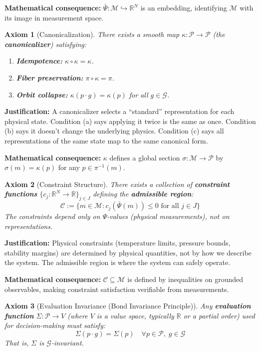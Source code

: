 \documentclass[11pt]{article}
\newtheorem{axiom}{Axiom}
\begin{document}
\textbf{Mathematical consequence:} $\bar{\Psi} : \mathcal{M} \hookrightarrow \mathbb{R}^N$ is an embedding, identifying $\mathcal{M}$ with its
image in measurement space.

\begin{axiom}[Canonicalization]
There exists a smooth map $\kappa : \mathcal{P} \to \mathcal{P}$ (the \textbf{canonicalizer})
satisfying:
\begin{enumerate}
    \item[(a)] \textbf{Idempotence:} $\kappa \circ \kappa = \kappa$.
    \item[(b)] \textbf{Fiber preservation:} $\pi \circ \kappa = \pi$.
    \item[(c)] \textbf{Orbit collapse:} $\kappa(p \cdot g) = \kappa(p)$ for all $g \in \mathcal{G}$.
\end{enumerate}
\end{axiom}

\textbf{Justification:} A canonicalizer selects a ``standard'' representation for each physical state.
Condition (a) says applying it twice is the same as once. Condition (b) says it doesn't change
the underlying physics. Condition (c) says all representations of the same state map to the
same canonical form.

\textbf{Mathematical consequence:} $\kappa$ defines a global section $\sigma : \mathcal{M} \to \mathcal{P}$ by $\sigma(m) = \kappa(p)$ for
any $p \in \pi^{-1}(m)$.

\begin{axiom}[Constraint Structure]
There exists a collection of \textbf{constraint functions} $\{c_j :
\mathbb{R}^N \to \mathbb{R}\}_{j \in J}$ defining the \textbf{admissible region}:
\[
\mathcal{C} := \{m \in \mathcal{M} : c_j(\bar{\Psi}(m)) \leq 0 \text{ for all } j \in J\}
\]
The constraints depend only on $\Psi$-values (physical measurements), not on representations.
\end{axiom}

\textbf{Justification:} Physical constraints (temperature limits, pressure bounds, stability margins)
are determined by physical quantities, not by how we describe the system. The admissible region
is where the system can safely operate.

\textbf{Mathematical consequence:} $\mathcal{C} \subseteq \mathcal{M}$ is defined by inequalities on grounded observables,
making constraint satisfaction verifiable from measurements.

\begin{axiom}[Evaluation Invariance (Bond Invariance Principle)]
Any \textbf{evaluation function}
$\Sigma : \mathcal{P} \to V$ (where $V$ is a value space, typically $\mathbb{R}$ or a partial order) used for decision-making
must satisfy:
\[
\Sigma(p \cdot g) = \Sigma(p) \quad \forall p \in \mathcal{P},\; g \in \mathcal{G}
\]
That is, $\Sigma$ is $\mathcal{G}$-invariant.
\end{axiom}
\end{document}
